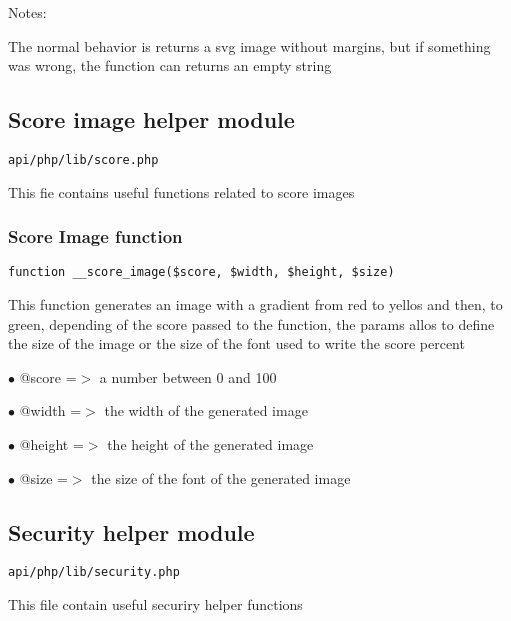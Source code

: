\documentclass[a4paper]{article}
\begin{document}
Notes:

The normal behavior is returns a svg image without margins, but if something
was wrong, the function can returns an empty string

\hypertarget{toc523}{}
\subsection{Score image helper module}

\begin{lstlisting}
api/php/lib/score.php
\end{lstlisting}

This fie contains useful functions related to score images

\hypertarget{toc524}{}
\subsubsection{Score Image function}

\begin{lstlisting}
function __score_image($score, $width, $height, $size)
\end{lstlisting}

This function generates an image with a gradient from red to yellos and
then, to green, depending of the score passed to the function, the params
allos to define the size of the image or the size of the font used to
write the score percent

\begin{compactitem}
\item[\color{myblue}$\bullet$] @score  =$>$ a number between 0 and 100
\item[\color{myblue}$\bullet$] @width  =$>$ the width of the generated image
\item[\color{myblue}$\bullet$] @height =$>$ the height of the generated image
\item[\color{myblue}$\bullet$] @size   =$>$ the size of the font of the generated image
\end{compactitem}

\hypertarget{toc525}{}
\subsection{Security helper module}

\begin{lstlisting}
api/php/lib/security.php
\end{lstlisting}

This file contain useful securiry helper functions
\end{document}
